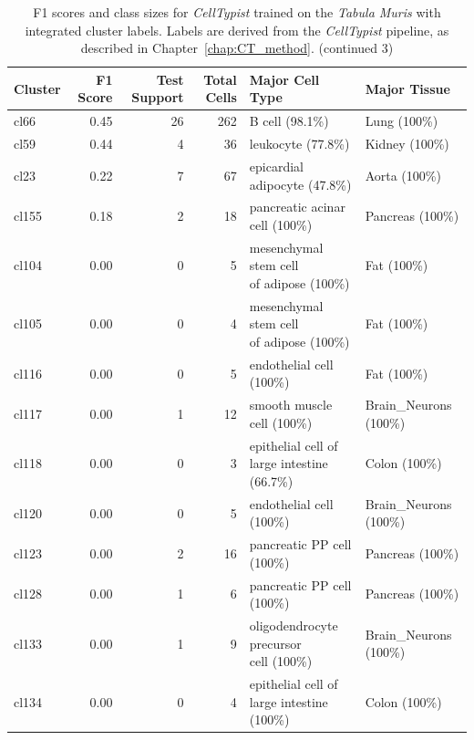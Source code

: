 \begin{table}[ht!]
\scriptsize
\caption[F1 scores and class sizes for \textit{CellTypist} trained on the \textit{Tabula Muris} with integrated cluster labels (continued 3)]{F1 scores and class sizes for \textit{CellTypist} trained on the \textit{Tabula Muris} with integrated cluster labels. Labels are derived from the \textit{CellTypist} pipeline, as described in Chapter~\ref{chap:CT_method}. (continued 3)}
\centering
\label{table:tab_tmmodelclust3}
\begin{tabular}{lrrrll}
  \toprule
Cluster & F1 Score & Test Support & Total Cells & Major Cell Type & Major Tissue \\
  \midrule
  cl66 & 0.45 &  26 & 262 & B cell (98.1\%) & Lung (100\%) \\ 
  cl59 & 0.44 &   4 &  36 & leukocyte (77.8\%) & Kidney (100\%) \\ 
  cl23 & 0.22 &   7 &  67 & epicardial adipocyte (47.8\%) & Aorta (100\%) \\ 
  cl155 & 0.18 &   2 &  18 & pancreatic acinar cell (100\%) & Pancreas (100\%) \\ 
  cl104 & 0.00 &   0 &   5 & \specialcell[t]{mesenchymal stem cell\\of adipose (100\%)} & Fat (100\%) \\ 
  cl105 & 0.00 &   0 &   4 & \specialcell[t]{mesenchymal stem cell\\of adipose (100\%)} & Fat (100\%) \\ 
  cl116 & 0.00 &   0 &   5 & endothelial cell (100\%) & Fat (100\%) \\ 
  cl117 & 0.00 &   1 &  12 & smooth muscle cell (100\%) & Brain\_Neurons (100\%) \\ 
  cl118 & 0.00 &   0 &   3 & \specialcell[t]{epithelial cell of\\large intestine (66.7\%)} & Colon (100\%) \\ 
  cl120 & 0.00 &   0 &   5 & endothelial cell (100\%) & Brain\_Neurons (100\%) \\ 
  cl123 & 0.00 &   2 &  16 & pancreatic PP cell (100\%) & Pancreas (100\%) \\ 
  cl128 & 0.00 &   1 &   6 & pancreatic PP cell (100\%) & Pancreas (100\%) \\ 
  cl133 & 0.00 &   1 &   9 & \specialcell[t]{oligodendrocyte precursor\\cell (100\%)} & Brain\_Neurons (100\%) \\ 
  cl134 & 0.00 &   0 &   4 & \specialcell[t]{epithelial cell of\\large intestine (100\%)} & Colon (100\%) \\ 

\end{tabular}
\end{table}
